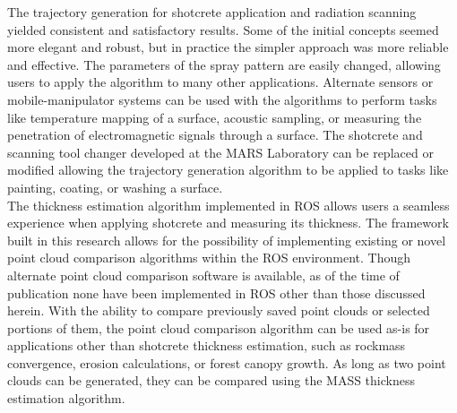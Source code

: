 The trajectory generation for shotcrete application and radiation scanning yielded consistent and satisfactory results. Some of the initial concepts seemed more elegant and robust, but in practice the simpler approach was more reliable and effective. The parameters of the spray pattern are easily changed, allowing users to apply the algorithm to many other applications. Alternate sensors or mobile-manipulator systems can be used with the algorithms to perform tasks like temperature mapping of a surface, acoustic sampling, or measuring the penetration of electromagnetic signals through a surface. The shotcrete and scanning tool changer developed at the MARS Laboratory can be replaced or modified allowing the trajectory generation algorithm to be applied to tasks like painting, coating, or washing a surface.\\

The thickness estimation algorithm implemented in ROS allows users a seamless experience when applying shotcrete and measuring its thickness. The framework built in this research allows for the possibility of implementing existing or novel point cloud comparison algorithms within the ROS environment. Though alternate point cloud comparison software is available, as of the time of publication none have been implemented in ROS other than those discussed herein. With the ability to compare previously saved point clouds or selected portions of them, the point cloud comparison algorithm can be used as-is for applications other than shotcrete thickness estimation, such as rockmass convergence, erosion calculations, or forest canopy growth. As long as two point clouds can be generated, they can be compared using the MASS thickness estimation algorithm.\\

